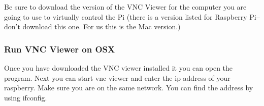 Be sure to download the version of the VNC Viewer for the computer you
are going to use to virtually control the Pi (there is a version listed
for Raspberry Pi-- don't download this one. For us this is the Mac
version.)

\subsubsection{Run VNC Viewer on OSX}\label{run-vnc-viewer-on-osx}

Once you have downloaded the VNC viewer installed it you can open the
program. Next you can start vnc viewer and enter the ip address of your
raspberry. Make sure you are on the same network. You can find the
address by using ifconfig.
